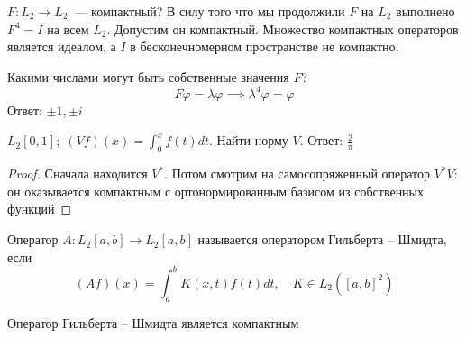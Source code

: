 \begin{example}
    $F: L_2 \to L_2$~--- компактный? \newline В силу того что мы продолжили $F$ на $L_2$ выполнено $F^4=I$ на всем $L_2$. Допустим он компактный. Множество компактных операторов является идеалом, а $I$ в бесконечномерном пространстве не компактно.
\end{example}

\begin{example}
    Какими числами могут быть собственные значения $F$?
    \[ F \varphi = \lambda \varphi \implies \lambda^4 \varphi = \varphi \]
    Ответ: $\pm 1, \pm i$
\end{example}

\begin{example}
    $L_2[0,1]; \; (Vf)(x) = \int_0^x f(t) dt$. Найти норму $V$.
    Ответ: $\frac{2}{\pi}$
\end{example}

\begin{proof}
    Сначала находится $V^*$. Потом смотрим на самосопряженный оператор $V^* V$: он оказывается компактным с ортонормированным базисом из собственных функций
\end{proof}

\begin{definition}
    Оператор $A: L_2[a, b] \to L_2[a, b]$ называется оператором Гильберта -- Шмидта, если 
    \[ (Af)(x) = \int_a^b K(x,t) f(t) dt, \quad K \in L_2([a,b]^2) \]
\end{definition}

\begin{theorem}
    Оператор Гильберта -- Шмидта является компактным
\end{theorem}


